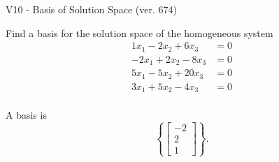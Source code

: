 \begin{exercise}
  \begin{exerciseTitle}V10 - Basis of Solution Space (ver. 674)\end{exerciseTitle}
  \begin{exerciseStatement}
    Find a basis for the solution space of the homogeneous system 
\begin{align*}
 1 x_ 1 -2 x_ 2 + 6 x_ 3 &= 0  \\ 
  -2 x_ 1 + 2 x_ 2 -8 x_ 3 &= 0  \\ 
  5 x_ 1 -5 x_ 2 + 20 x_ 3 &= 0  \\ 
  3 x_ 1 + 5 x_ 2 -4 x_ 3 &= 0  \\ 
 \end{align*}


 
  \end{exerciseStatement}

  \begin{exerciseAnswer}
   A basis is   
\[\left\{\left[\begin{array}{c}
-2 \\
2 \\
1
\end{array}\right]\right\}.\]

  


  \end{exerciseAnswer}
\end{exercise}
